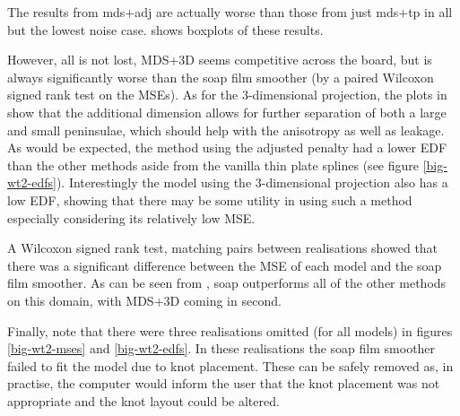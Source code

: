The results from mds+adj are actually worse than those from just mds+tp in all but the lowest noise case.  shows boxplots of these results.

However, all is not lost, MDS+3D seems competitive across the board, but is always significantly worse than the soap film smoother (by a paired Wilcoxon signed rank test on the MSEs).  As for the 3-dimensional projection, the plots in  show that the additional dimension allows for further separation of both a large and small peninsulae, which should help with the anisotropy as well as leakage. As would be expected, the method using the adjusted penalty had a lower EDF than the other methods aside from the vanilla thin plate splines (see figure \ref{big-wt2-edfs}). Interestingly the model using the 3-dimensional projection also has a low EDF, showing that there may be some utility in using such a method especially considering its relatively low MSE.

A Wilcoxon signed rank test, matching pairs between realisations showed that there was a significant difference between the MSE of each model and the soap film smoother. As can be seen from , soap outperforms all of the other methods on this domain, with MDS+3D coming in second. 

Finally, note that there were three realisations omitted (for all models) in figures \ref{big-wt2-mses} and \ref{big-wt2-edfs}. In these realisations the soap film smoother failed to fit the model due to knot placement. These can be safely removed as, in practise, the computer would inform the user that the knot placement was not appropriate and the knot layout could be altered.

